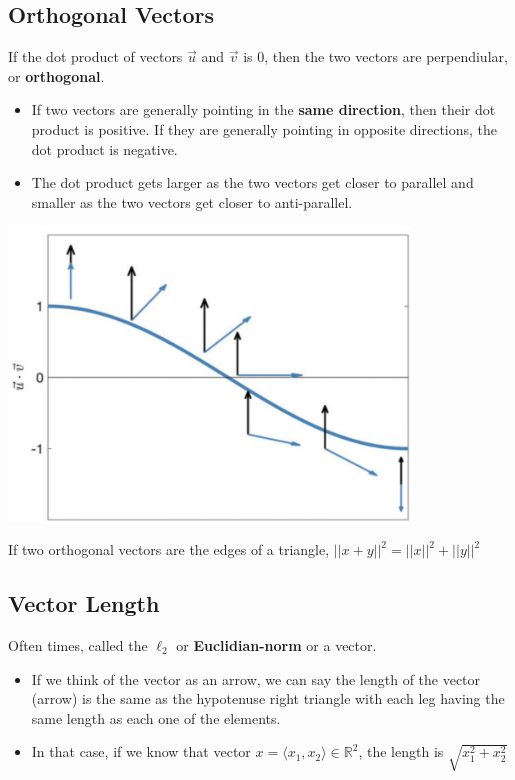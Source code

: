 \documentclass[10pt]{article}
\begin{document}
\subsection*{Orthogonal Vectors}
If the dot product of vectors $\vec{u}$ and $\vec{v}$ is 0, then the two vectors are perpendiular, or \textbf{orthogonal}.
\begin{itemize}
	\item If two vectors are generally pointing in the \textbf{same direction}, then their dot product is positive.  If they are generally pointing in opposite directions, the dot product is negative.
	\item The dot product gets larger as the two vectors get closer to parallel and smaller as the two vectors get closer to anti-parallel.
\end{itemize}
\begin{center} 
	\includegraphics*[width=0.8\textwidth]{M5_2.png} 
\end{center}
If two orthogonal vectors are the edges of a triangle, $||x + y||^2 = ||x||^2 + ||y||^2$

\subsection*{Vector Length}
Often times, called the $\ell_2$ or \textbf{Euclidian-norm} or a vector.
\begin{itemize}
	\item If we think of the vector as an arrow, we can say the length of the vector (arrow) is the same as the hypotenuse right triangle with each leg having the same length as each one of the elements.
	\item In that case, if we know that vector $x = \langle x_1, x_2 \rangle \in \mathbb{R}^2$, the length is $\sqrt{x_1^2 + x_2^2}$
\end{itemize}
\end{document}
